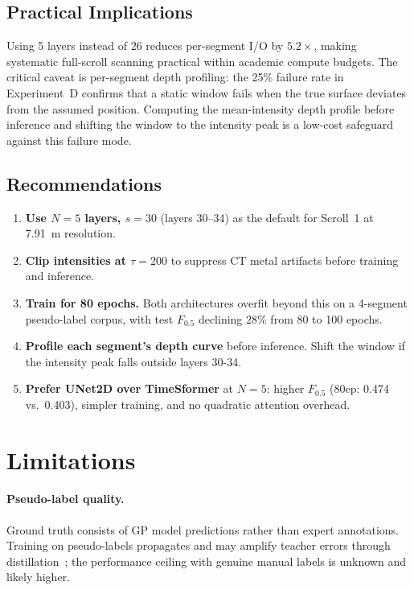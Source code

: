 \subsection{Practical Implications}

Using 5 layers instead of 26 reduces per-segment I/O by $5.2\times$, making systematic full-scroll scanning practical within academic compute budgets. The critical caveat is per-segment depth profiling: the 25\% failure rate in Experiment~D confirms that a static window fails when the true surface deviates from the assumed position. Computing the mean-intensity depth profile before inference and shifting the window to the intensity peak is a low-cost safeguard against this failure mode.

\subsection{Recommendations}

\begin{enumerate}
    \item \textbf{Use $N = 5$ layers, $s = 30$} (layers 30--34) as the default for Scroll~1 at 7.91~\textmu m resolution.
    \item \textbf{Clip intensities at $\tau = 200$} to suppress CT metal artifacts before training and inference.
    \item \textbf{Train for 80 epochs.} Both architectures overfit beyond this on a 4-segment pseudo-label corpus, with test $F_{0.5}$ declining $28\%$ from 80 to 100 epochs.
    \item \textbf{Profile each segment's depth curve} before inference. Shift the window if the intensity peak falls outside layers 30-34.
    \item \textbf{Prefer UNet2D over TimeSformer} at $N = 5$: higher $F_{0.5}$ (80ep: 0.474 vs.\ 0.403), simpler training, and no quadratic attention overhead.
\end{enumerate}

\section{Limitations}
\label{sec:limitations}

\paragraph{Pseudo-label quality.} Ground truth consists of GP model predictions rather than expert annotations. Training on pseudo-labels propagates and may amplify teacher errors through distillation~\cite{hinton2015distilling,lee2013pseudo}; the performance ceiling with genuine manual labels is unknown and likely higher.


